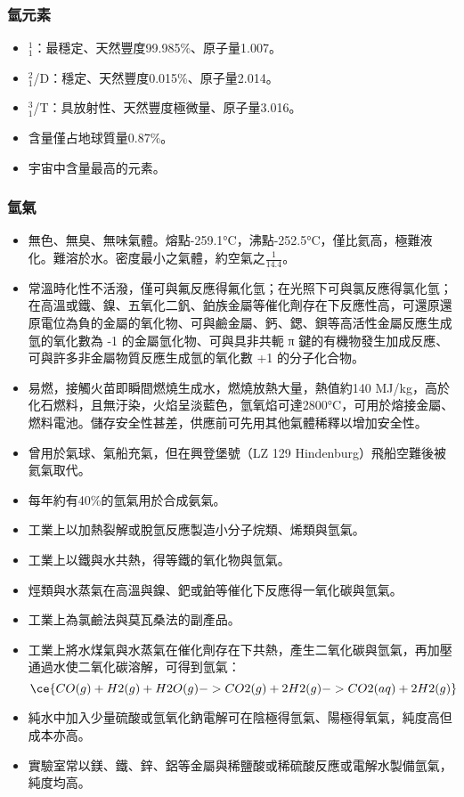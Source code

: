 \documentclass[a4paper,12pt]{report}
\begin{document}
\subsubsection{氫元素}
\begin{itemize}
\item {}$^1_1$\rmH：最穩定、天然豐度99.985\%、原子量1.007。
\item {}$^2_1$\rmH/D：穩定、天然豐度0.015\%、原子量2.014。
\item {}$^3_1$\rmH/T：具放射性、天然豐度極微量、原子量3.016。
\item 含量僅占地球質量0.87\%。
\item 宇宙中含量最高的元素。
\end{itemize}
\subsubsection{氫氣}
\begin{itemize}
\item 無色、無臭、無味氣體。熔點-259.1°C，沸點-252.5°C，僅比氦高，極難液化。難溶於水。密度最小之氣體，約空氣之$\frac{1}{14.4}$。
\item 常溫時化性不活潑，僅可與氟反應得氟化氫；在光照下可與氯反應得氯化氫；在高溫或鐵、鎳、五氧化二釩、鉑族金屬等催化劑存在下反應性高，可還原還原電位為負的金屬的氧化物、可與鹼金屬、鈣、鍶、鋇等高活性金屬反應生成氫的氧化數為 -1 的金屬氫化物、可與具非共軛 π 鍵的有機物發生加成反應、可與許多非金屬物質反應生成氫的氧化數 +1 的分子化合物。
\item 易燃，接觸火苗即瞬間燃燒生成水，燃燒放熱大量，熱值約140 MJ/kg，高於化石燃料，且無汙染，火焰呈淡藍色，氫氧焰可達2800°C，可用於熔接金屬、燃料電池。儲存安全性甚差，供應前可先用其他氣體稀釋以增加安全性。
\item 曾用於氣球、氣船充氣，但在興登堡號（LZ 129 Hindenburg）飛船空難後被氦氣取代。
\item 每年約有40\%的氫氣用於合成氨氣。
\item 工業上以加熱裂解或脫氫反應製造小分子烷類、烯類與氫氣。
\item 工業上以鐵與水共熱，得等鐵的氧化物與氫氣。
\item 烴類與水蒸氣在高溫與鎳、鈀或鉑等催化下反應得一氧化碳與氫氣。
\item 工業上為氯鹼法與莫瓦桑法的副產品。
\item 工業上將水煤氣與水蒸氣在催化劑存在下共熱，產生二氧化碳與氫氣，再加壓通過水使二氧化碳溶解，可得到氫氣：
\[\ce{CO(g) + H2(g) + H2O(g) -> CO2(g) + 2H2(g) -> CO2(aq) + 2H2(g)}\]
\item 純水中加入少量硫酸或氫氧化鈉電解可在陰極得氫氣、陽極得氧氣，純度高但成本亦高。
\item 實驗室常以鎂、鐵、鋅、鋁等金屬與稀鹽酸或稀硫酸反應或電解水製備氫氣，純度均高。
\end{itemize}
\end{document}
